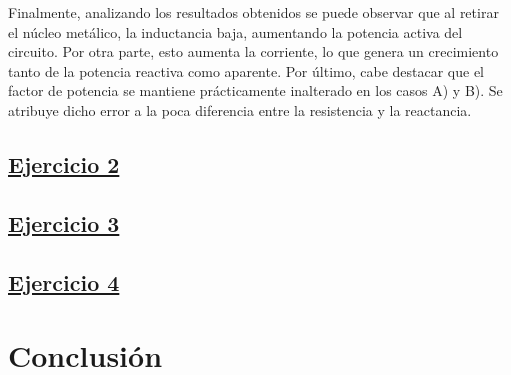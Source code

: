 \documentclass[a4paper]{article}
\begin{document}
Finalmente, analizando los resultados obtenidos se puede observar que al retirar el núcleo metálico, la inductancia baja, aumentando la potencia activa del circuito. Por otra parte, esto aumenta la corriente, lo que genera un crecimiento tanto de la potencia reactiva como aparente. Por último, cabe destacar que el factor de potencia se mantiene prácticamente inalterado en los casos A) y B). Se atribuye dicho error a la poca diferencia entre la resistencia y la reactancia.

\subsection*{\underline{Ejercicio 2}}

\newpage

\subsection*{\underline{Ejercicio 3}}

\newpage

\subsection*{\underline{Ejercicio 4}}

\section*{Conclusión}
\end{document}
